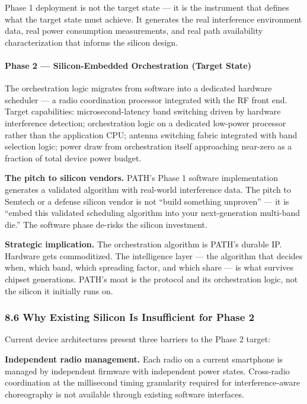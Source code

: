 \documentclass[
  11pt,
]{article}
\begin{document}
Phase 1 deployment is not the target state --- it is the instrument that
defines what the target state must achieve. It generates the real
interference environment data, real power consumption measurements, and
real path availability characterization that informs the silicon design.

\hypertarget{phase-2-silicon-embedded-orchestration-target-state}{%
\paragraph{Phase 2 --- Silicon-Embedded Orchestration (Target
State)}\label{phase-2-silicon-embedded-orchestration-target-state}}

The orchestration logic migrates from software into a dedicated hardware
scheduler --- a radio coordination processor integrated with the RF
front end. Target capabilities: microsecond-latency band switching
driven by hardware interference detection; orchestration logic on a
dedicated low-power processor rather than the application CPU; antenna
switching fabric integrated with band selection logic; power draw from
orchestration itself approaching near-zero as a fraction of total device
power budget.

\textbf{The pitch to silicon vendors.} PATH's Phase 1 software
implementation generates a validated algorithm with real-world
interference data. The pitch to Semtech or a defense silicon vendor is
not ``build something unproven'' --- it is ``embed this validated
scheduling algorithm into your next-generation multi-band die.'' The
software phase de-risks the silicon investment.

\textbf{Strategic implication.} The orchestration algorithm is PATH's
durable IP. Hardware gets commoditized. The intelligence layer --- the
algorithm that decides when, which band, which spreading factor, and
which share --- is what survives chipset generations. PATH's moat is the
protocol and its orchestration logic, not the silicon it initially runs
on.

\hypertarget{why-existing-silicon-is-insufficient-for-phase-2}{%
\subsubsection{8.6 Why Existing Silicon Is Insufficient for Phase
2}\label{why-existing-silicon-is-insufficient-for-phase-2}}

Current device architectures present three barriers to the Phase 2
target:

\textbf{Independent radio management.} Each radio on a current
smartphone is managed by independent firmware with independent power
states. Cross-radio coordination at the millisecond timing granularity
required for interference-aware choreography is not available through
existing software interfaces.
\end{document}
